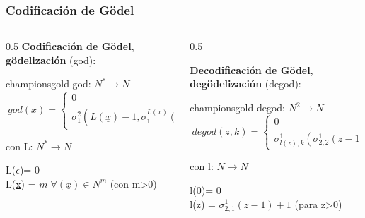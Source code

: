 \documentclass[xcolor=table]{beamer}
\begin{document}
\begin{frame}[fragile]\frametitle{Codificación de Gödel} \scriptsize


\begin{columns}

    \begin{column}{0.5\textwidth}
     \textbf{Codificación de Gödel}, \textbf{gödelización} (god):

         \begin{colorblock}[black]{championsgold}{}\scriptsize
        god: $N^* \rightarrow N$
          \[\  god(\underline{x}) = \left\{ 
          \begin{array}{lr} 
              0 & si\; L(\underline{x}) = 0\\ 
              \sigma^2_{1}(L(\underline{x})-1, \sigma^{L(\underline{x})}_{1}(\underline{x})) +1 & si\; L(\underline{x}) \neq 0 
          \end{array} \right. \]


          con  L: $N^* \rightarrow N$

         \hspace{0.5cm}  L($\epsilon$)= 0\\
         \hspace{0.5cm}  L(\underline{x}) = $m \;\forall (\underline{x}) \in N^m$ (con m>0)
        \end{colorblock}

   
         
    
    \end{column}

    \begin{column}{0.5\textwidth}

     \textbf{Decodificación de Gödel},  \textbf{degödelización} (degod):

       \begin{colorblock}[black]{championsgold}{}\scriptsize
        degod: $N^2 \rightarrow N$
          \[\  degod(z,k) = \left\{ 
          \begin{array}{ll} 
              0 & si\; z=0 \lor k>l(z)\\ 
              \sigma^1_{l(z),k}( \sigma^1_{2,2}(z-1))  & resto 
          \end{array} \right. \]


          con  l: $N \rightarrow N$

         \hspace{0.5cm}  l(0)= 0\\
         \hspace{0.5cm}  l(z) = $\sigma^1_{2,1}(z-1)+1 $ (para z>0)
        \end{colorblock}
        
    \end{column}
    
\end{columns}


\end{frame}
\end{document}
